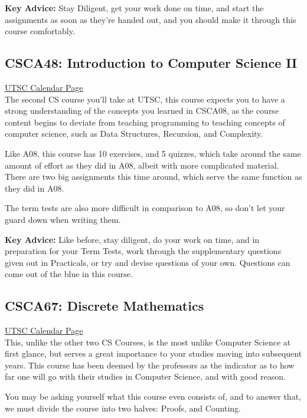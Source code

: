 \documentclass[11pt]{article}
\begin{document}
\textbf{Key Advice:} 
Stay Diligent, get your work done on time, and start the assignments as
soon as they're handed out, and you should make it through this course
comfortably.


\subsection{CSCA48: Introduction to Computer Science II}

\href{https://utsc.calendar.utoronto.ca/course/CSCA48H3}{UTSC Calendar Page}\\

The second CS course you'll take at UTSC, this course expects you to
have a strong understanding of the concepts you learned in CSCA08,
as the course content begins to deviate from teaching programming
to teaching concepts of computer science, such as Data Structures,
Recursion, and Complexity.

Like A08, this course has 10 exercises, and 5 quizzes, which take
around the same amount of effort as they did in A08, albeit with more
complicated material. There are two big assignments this time around,
which serve the same function as they did in A08.

The term tests are also more difficult in comparison to A08, so don't
let your guard down when writing them.


\textbf{Key Advice:} 
Like before, stay diligent, do your work on time, and in preparation for
your Term Tests, work through the supplementary questions given out in
Practicals, or try and devise questions of your own. Questions can come
out of the blue in this course.

\subsection{CSCA67: Discrete Mathematics}

\href{https://utsc.calendar.utoronto.ca/course/CSCA67H3}{UTSC Calendar Page}\\

This, unlike the other two CS Courses, is the most unlike Computer
Science at first glance, but serves a great importance to your studies
moving into subsequent years. This course has been deemed by the
professors as the indicator as to how far one will go with their studies
in Computer Science, and with good reason.

You may be asking yourself what this course even consists of, and to
answer that, we must divide the course into two halves: Proofs, and
Counting.
\end{document}
